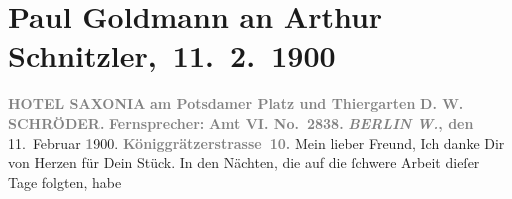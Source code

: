 

         
         \renewcommand{\erwaehntePersonen}{Personen: Cesare Borgia, Gerhart Hauptmann, D. W. Schröder, William Shakespeare}
         \renewcommand{\erwaehnteOrte}{Orte: Berlin, Bologna, Deutsches Theater Berlin, Hotel Saxonia, Potsdamer Platz, Stresemannstraße, Tiergarten, Wien}
         \renewcommand{\erwaehnteWerke}{Werke: Der Schleier der Beatrice. Schauspiel in fünf Akten, Schluck und Jau}
               \section[ Paul Goldmann an Arthur Schnitzler, 11. 2. 1900]{ Paul Goldmann an Arthur Schnitzler, 11. 2. 1900}\nopagebreak{}\rehead{ }\begin{ledgroupsized}[t]{13cm}\normalsize\beginnumbering \toendnotes[C]{\smallbreak\pagebreak[2]} 
\toendnotes[C]{\smallbreak}\pstart
           \noindent{}\centering{}{\pb}\textcolor{gray}{\textbf{\textbf{HOTEL SAXONIA}}}\pend
           \pstart
           \noindent{}\raggedleft{}\textcolor{gray}{\textbf{am Potsdamer Platz und
                        Thiergarten}}\pend
           \pstart
           \noindent{}\centering{}\textcolor{gray}{\textbf{D. W. SCHRÖDER.}}\pend
           \pstart
           \noindent{}\textcolor{gray}{\textbf{Fernsprecher:}}\pend
           \pstart
           \textcolor{gray}{\textbf{\textbf{Amt VI. No. 2838.}}}\pend
           \pstart
           \raggedleft{}\textcolor{gray}{\textbf{\emph{BERLIN W.}, den}}{ }11. Februar \textcolor{gray}{\textbf{1}}900. \pend
           \pstart
           \raggedleft{}\textcolor{gray}{\textbf{Königgrätzerstrasse 10.}}\pend
           \pstart{}Mein lieber Freund,\pend\pstart
           Ich danke Dir von Herzen für Dein Stück. In den Nächten, die auf die ſchwere Arbeit dieſer Tage folgten, habe

\end{ledgroupsized}
